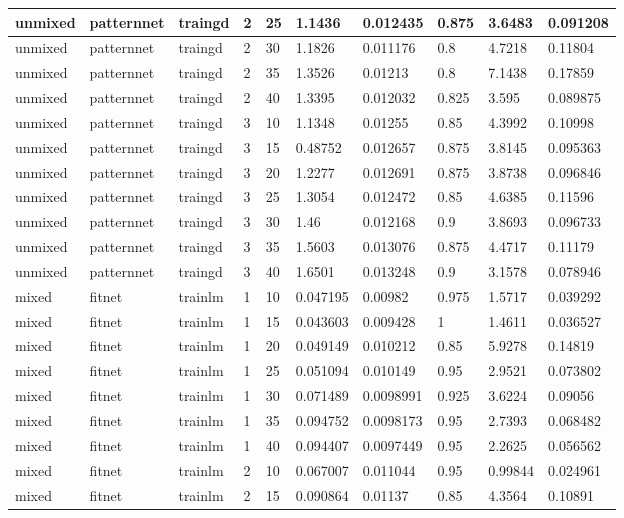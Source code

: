 \begin{longtable}{lllllllll}
unmixed & patternnet & traingd & 2 & 25 & 1.1436 & 0.012435 & 0.875 & 3.6483 & 0.091208 \\ \hline 
unmixed & patternnet & traingd & 2 & 30 & 1.1826 & 0.011176 & 0.8 & 4.7218 & 0.11804 \\ \hline 
unmixed & patternnet & traingd & 2 & 35 & 1.3526 & 0.01213 & 0.8 & 7.1438 & 0.17859 \\ \hline 
unmixed & patternnet & traingd & 2 & 40 & 1.3395 & 0.012032 & 0.825 & 3.595 & 0.089875 \\ \hline 
unmixed & patternnet & traingd & 3 & 10 & 1.1348 & 0.01255 & 0.85 & 4.3992 & 0.10998 \\ \hline 
unmixed & patternnet & traingd & 3 & 15 & 0.48752 & 0.012657 & 0.875 & 3.8145 & 0.095363 \\ \hline 
unmixed & patternnet & traingd & 3 & 20 & 1.2277 & 0.012691 & 0.875 & 3.8738 & 0.096846 \\ \hline 
unmixed & patternnet & traingd & 3 & 25 & 1.3054 & 0.012472 & 0.85 & 4.6385 & 0.11596 \\ \hline 
unmixed & patternnet & traingd & 3 & 30 & 1.46 & 0.012168 & 0.9 & 3.8693 & 0.096733 \\ \hline 
unmixed & patternnet & traingd & 3 & 35 & 1.5603 & 0.013076 & 0.875 & 4.4717 & 0.11179 \\ \hline 
unmixed & patternnet & traingd & 3 & 40 & 1.6501 & 0.013248 & 0.9 & 3.1578 & 0.078946 \\ \hline 
mixed & fitnet & trainlm & 1 & 10 & 0.047195 & 0.00982 & 0.975 & 1.5717 & 0.039292 \\ \hline 
mixed & fitnet & trainlm & 1 & 15 & 0.043603 & 0.009428 & 1 & 1.4611 & 0.036527 \\ \hline 
mixed & fitnet & trainlm & 1 & 20 & 0.049149 & 0.010212 & 0.85 & 5.9278 & 0.14819 \\ \hline 
mixed & fitnet & trainlm & 1 & 25 & 0.051094 & 0.010149 & 0.95 & 2.9521 & 0.073802 \\ \hline 
mixed & fitnet & trainlm & 1 & 30 & 0.071489 & 0.0098991 & 0.925 & 3.6224 & 0.09056 \\ \hline 
mixed & fitnet & trainlm & 1 & 35 & 0.094752 & 0.0098173 & 0.95 & 2.7393 & 0.068482 \\ \hline 
mixed & fitnet & trainlm & 1 & 40 & 0.094407 & 0.0097449 & 0.95 & 2.2625 & 0.056562 \\ \hline 
mixed & fitnet & trainlm & 2 & 10 & 0.067007 & 0.011044 & 0.95 & 0.99844 & 0.024961 \\ \hline 
mixed & fitnet & trainlm & 2 & 15 & 0.090864 & 0.01137 & 0.85 & 4.3564 & 0.10891 \\ \hline 

\end{longtable}
